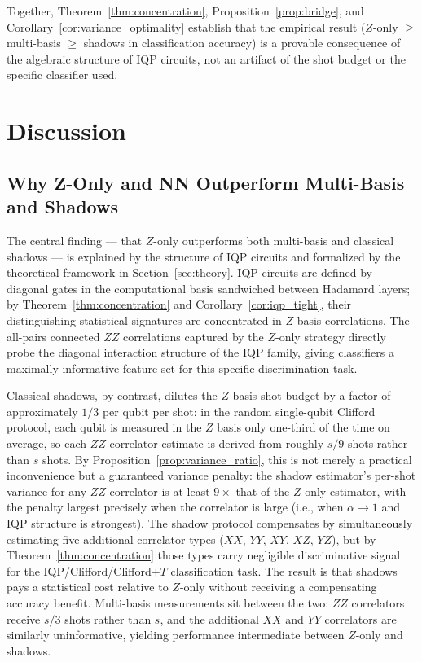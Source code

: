 \documentclass[conference]{IEEEtran}
\newcommand{\shots}{s}
\begin{document}
Together, Theorem~\ref{thm:concentration}, Proposition~\ref{prop:bridge}, and Corollary~\ref{cor:variance_optimality} establish that the empirical result ($Z$-only $\geq$ multi-basis $\geq$ shadows in classification accuracy) is a provable consequence of the algebraic structure of IQP circuits, not an artifact of the shot budget or the specific classifier used.

\section{Discussion}
\label{sec:discussion}

\subsection{Why Z-Only and NN Outperform Multi-Basis and Shadows}

The central finding --- that $Z$-only outperforms both multi-basis and classical shadows --- is explained by the structure of IQP circuits and formalized by the theoretical framework in Section~\ref{sec:theory}.
IQP circuits are defined by diagonal gates in the computational basis sandwiched between Hadamard layers; by Theorem~\ref{thm:concentration} and Corollary~\ref{cor:iqp_tight}, their distinguishing statistical signatures are concentrated in $Z$-basis correlations.
The all-pairs connected $ZZ$ correlations captured by the $Z$-only strategy directly probe the diagonal interaction structure of the IQP family, giving classifiers a maximally informative feature set for this specific discrimination task.

Classical shadows, by contrast, dilutes the $Z$-basis shot budget by a factor of approximately $1/3$ per qubit per shot: in the random single-qubit Clifford protocol, each qubit is measured in the $Z$ basis only one-third of the time on average, so each $ZZ$ correlator estimate is derived from roughly $\shots/9$ shots rather than $\shots$ shots.
By Proposition~\ref{prop:variance_ratio}, this is not merely a practical inconvenience but a guaranteed variance penalty: the shadow estimator's per-shot variance for any $ZZ$ correlator is at least $9\times$ that of the $Z$-only estimator, with the penalty largest precisely when the correlator is large (i.e., when $\alpha \to 1$ and IQP structure is strongest).
The shadow protocol compensates by simultaneously estimating five additional correlator types ($XX$, $YY$, $XY$, $XZ$, $YZ$), but by Theorem~\ref{thm:concentration} those types carry negligible discriminative signal for the IQP/Clifford/Clifford$+T$ classification task.
The result is that shadows pays a statistical cost relative to $Z$-only without receiving a compensating accuracy benefit.
Multi-basis measurements sit between the two: $ZZ$ correlators receive $\shots/3$ shots rather than $\shots$, and the additional $XX$ and $YY$ correlators are similarly uninformative, yielding performance intermediate between $Z$-only and shadows.
\end{document}
